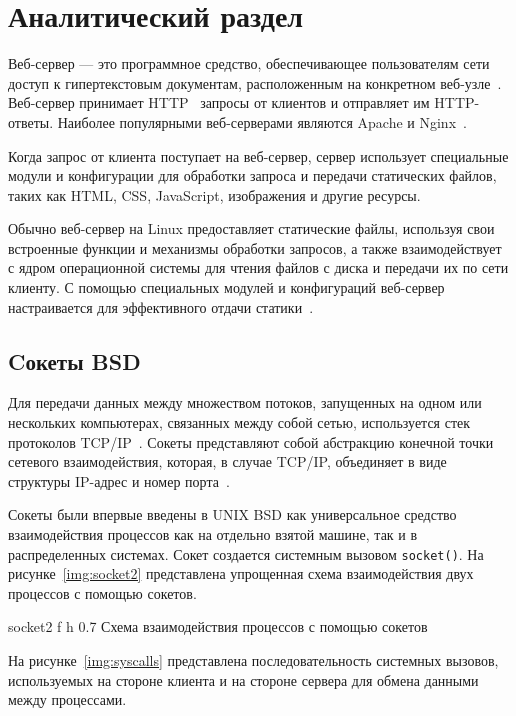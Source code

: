 \chapter{Аналитический раздел}

Веб-сервер --- это программное средство, обеспечивающее пользователям сети доступ к гипертекстовым документам, расположенным на конкретном веб-узле~\cite{yeager1996web}. Веб-сервер принимает HTTP~\cite{touch1998analysis} запросы от клиентов и отправляет им HTTP-ответы. Наиболее популярными веб-серверами являются Apache и Nginx~\cite{putro2022comparison}.

Когда запрос от клиента поступает на веб-сервер, сервер использует специальные модули и конфигурации для обработки запроса и передачи статических файлов, таких как HTML, CSS, JavaScript, изображения и другие ресурсы.

Обычно веб-сервер на Linux предоставляет статические файлы, используя свои встроенные функции и механизмы обработки запросов, а также взаимодействует с ядром операционной системы для чтения файлов с диска и передачи их по сети клиенту. С помощью специальных модулей и конфигураций веб-сервер настраивается для эффективного отдачи статики~\cite{putro2022comparison}.

\section{Cокеты BSD}

Для передачи данных между множеством потоков, запущенных на одном или нескольких компьютерах, связанных между собой сетью, используется стек протоколов TCP/IP~\cite{tian2023building}. Сокеты представляют собой абстракцию конечной точки сетевого взаимодействия, которая, в случае TCP/IP, объединяет в виде структуры IP-адрес и номер порта~\cite{stivens}.

Сокеты были впервые введены в UNIX BSD как универсальное средство взаимодействия процессов как на отдельно взятой машине, так и в распределенных системах. Сокет создается системным вызовом \texttt{socket()}. На рисунке~\ref{img:socket2} представлена упрощенная схема взаимодействия двух процессов с помощью сокетов.

    {socket2}
    {f}
    {h}
    {0.7\linewidth}
    {Схема взаимодействия процессов с помощью сокетов}

На рисунке~\ref{img:syscalls} представлена последовательность системных вызовов, используемых на стороне клиента и на стороне сервера для обмена данными между процессами.

